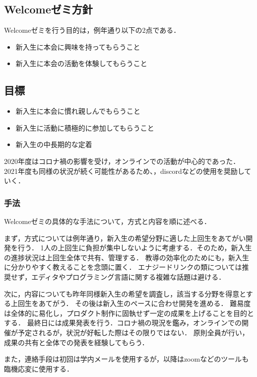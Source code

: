 \subsection*{Welcomeゼミ方針}


Welcomeゼミを行う目的は，例年通り以下の2点である．

\begin{itemize}
    \item 新入生に本会に興味を持ってもらうこと
    \item 新入生に本会の活動を体験してもらうこと
\end{itemize}

\subsection*{目標}
\begin{itemize}
    \item 新入生に本会に慣れ親しんでもらうこと
    \item 新入生に活動に積極的に参加してもらうこと
    \item 新入生の中長期的な定着
\end{itemize}

2020年度はコロナ禍の影響を受け，オンラインでの活動が中心的であった．
2021年度も同様の状況が続く可能性があるため、，discordなどの使用を奨励していく．

\subsubsection*{手法}
Welcomeゼミの具体的な手法について，方式と内容を順に述べる．

まず，方式については例年通り，新入生の希望分野に適した上回生をあてがい開発を行う．
1人の上回生に負担が集中しないように考慮する．そのため，新入生の進捗状況は上回生全体で共有、管理する．
教導の効率化のためにも，新入生に分かりやすく教えることを念頭に置く．
エナジードリンクの類については推奨せず，エディタやプログラミング言語に関する複雑な話題は避ける．

次に，内容についても昨年同様新入生の希望を調査し，該当する分野を得意とする上回生をあてがう．
その後は新入生のペースに合わせ開発を進める．
難易度は全体的に易化し，プロダクト制作に固執せず一定の成果を上げることを目的とする．
最終日には成果発表を行う．コロナ禍の現況を鑑み，オンラインでの開催が予定されるが，状況が好転した際はその限りではない．
原則全員が行い，成果の共有と全体での発表を経験してもらう．

また，連絡手段は初回は学内メールを使用するが，以降はzoomなどのツールも臨機応変に使用する．
